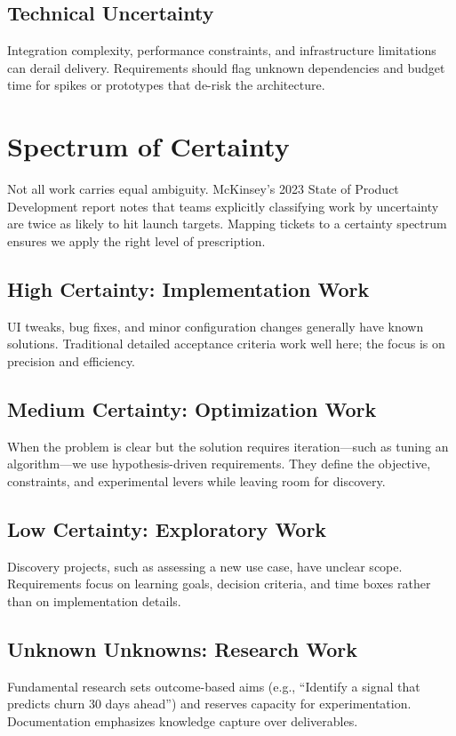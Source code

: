 \subsection{Technical Uncertainty}
Integration complexity, performance constraints, and infrastructure limitations can derail delivery. Requirements should flag unknown dependencies and budget time for spikes or prototypes that de-risk the architecture.

\section{Spectrum of Certainty}
\label{sec:certainty-spectrum}

Not all work carries equal ambiguity. McKinsey’s 2023 State of Product Development report notes that teams explicitly classifying work by uncertainty are twice as likely to hit launch targets. Mapping tickets to a certainty spectrum ensures we apply the right level of prescription.

\subsection{High Certainty: Implementation Work}
UI tweaks, bug fixes, and minor configuration changes generally have known solutions. Traditional detailed acceptance criteria work well here; the focus is on precision and efficiency.

\subsection{Medium Certainty: Optimization Work}
When the problem is clear but the solution requires iteration—such as tuning an algorithm—we use hypothesis-driven requirements. They define the objective, constraints, and experimental levers while leaving room for discovery.

\subsection{Low Certainty: Exploratory Work}
Discovery projects, such as assessing a new use case, have unclear scope. Requirements focus on learning goals, decision criteria, and time boxes rather than on implementation details.

\subsection{Unknown Unknowns: Research Work}
Fundamental research sets outcome-based aims (e.g., ``Identify a signal that predicts churn 30 days ahead'') and reserves capacity for experimentation. Documentation emphasizes knowledge capture over deliverables.

